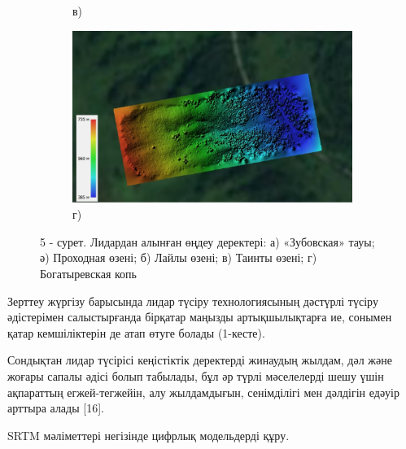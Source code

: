 \begin{figure}[H]
\begin{subfigure}[t]{0.45\textwidth}
        \caption*{в)}
    \end{subfigure}
    \begin{subfigure}[t]{0.7\textwidth}
        \centering
        \includegraphics[width=\textwidth]{media/ict2/image207}
        \caption*{г)}
    \end{subfigure}
    \caption*{5 - сурет. Лидардан алынған өңдеу деректері: а) «Зубовская» тауы; ә) Проходная өзені; б) Лайлы өзені; в) Таинты өзені; г) Богатыревская копь}
\end{figure}

\begin{multicols}{2}
Зерттеу жүргізу барысында лидар түсіру технологиясының дәстүрлі түсіру
әдістерімен салыстырғанда бірқатар маңызды артықшылықтарға ие, сонымен
қатар кемшіліктерін де атап өтуге болады (1-кесте).

Сондықтан лидар түсірісі кеңістіктік деректерді жинаудың жылдам, дәл
және жоғары сапалы әдісі болып табылады, бұл әр түрлі мәселелерді шешу
үшін ақпараттың егжей-тегжейін, алу жылдамдығын, сенімділігі мен
дәлдігін едәуір арттыра алады {[}16{]}.

SRTM мәліметтері негізінде цифрлық модельдерді құру.
\end{multicols}

